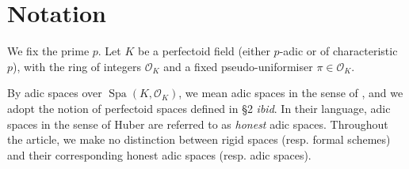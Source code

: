 \documentclass[10pt,oneside]{amsart}
\theoremstyle{definition}
\begin{document}
\begin{comment}
We then construct a tilde-limit of $\varprojlim_{[p]} A$ from $E_\infty$: By Raynaud uniformisation, $A$ is naturally isomorphic to the rigid analytic quotient of $E$ by a lattice $M$. After a choice of $\Gamma_0(p^\infty)$-structure, the $[p]$-multiplication tower of $E/M$ factors in a ``ramified'' and an ``\'etale'' part. By a careful choice of charts of $E/M$ in terms of subspaces of $E$ that behave well under $[p^n]:E\rightarrow E$, one can explicitly construct first a perfectoid tilde-limit of the ``ramified'' tower, and then in a second step the space $A_\infty$. This space is independent of the choice of $\Gamma_0(p^\infty)$-structure but remembers it as a pro-\'etale subgroup $D_\infty \subseteq A_\infty$. The construction shows that the perfectoid tilde-limit $A_\infty$ still exists under the weaker assumption that $K$ is a perfectoid field over which there exist lattices $M^{1/p^n}$ for all $n$ whose $p^n$-th multiple is $M$.

The approach via explicit covers finally gives an explicit description of $A_\infty$ in terms of open subspaces of $E_\infty$ which we use in the last section to study the induced map $E_\infty\rightarrow A_\infty$. We show that $E_\infty$ is in fact an open subspace of $A_\infty$ and thus obtain a second description of $A_\infty$ as a quotient group $(D_\infty\times E_\infty)/M_\infty$.


\newpage

\end{comment}




\section*{Notation}
	We fix the prime $p$.  Let $K$ be a perfectoid field (either $p$-adic or of characteristic $p$), with the ring of integers  $\mathcal O_K$  and  a fixed pseudo-uniformiser $\pi\in \mathcal O_K$. 
	
	By adic spaces over $\operatorname{Spa}(K,\mathcal O_K)$, we mean adic spaces in the sense of \cite{SW}, and we adopt the notion of perfectoid spaces defined in \S2 \textit{\small ibid}. In their language, adic spaces in the sense of Huber are referred to as \textit{honest} adic spaces. Throughout the article, we make no distinction between rigid spaces (resp. formal schemes) and their corresponding honest adic spaces (resp. adic spaces). 
	
\end{document}
